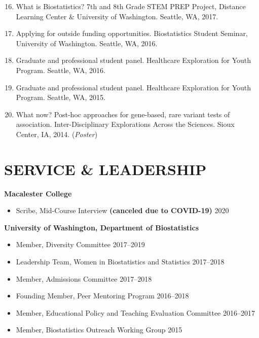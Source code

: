 \documentclass[margin]{res}
\newenvironment{benumerate}[1]{
    \let\oldItem\item
    \def\item{\addtocounter{enumi}{-2}\oldItem}
    
    \begin{enumerate}
    \setcounter{enumi}{#1}
    \addtocounter{enumi}{1}
}{
    \end{enumerate}
}
\begin{document}
\begin{resume}
\begin{benumerate}{15}
\item %
What is Biostatistics? 7th and 8th Grade STEM PREP Project, Distance Learning Center \& University of Washington. Seattle, WA, 2017.

\item %
Applying for outside funding opportunities. Biostatistics Student Seminar, University of Washington. Seattle, WA, 2016.

\item Graduate and professional student panel. Healthcare Exploration for Youth Program. Seattle, WA, 2016.

\item Graduate and professional student panel. Healthcare Exploration for Youth Program. Seattle, WA, 2015.

\item %
What now? Post-hoc approaches for gene-based, rare variant tests of association. Inter-Disciplinary Explorations Across the Sciences. Sioux Center, IA, 2014.  (\textit{Poster})\\
\end{benumerate}

\section{SERVICE \& LEADERSHIP}  
\textbf{Macalester College}
	\begin{itemize} \itemsep -2pt
	\item Scribe, Mid-Course Interview \textbf{(canceled due to COVID-19)}  \hfill 2020
	\end{itemize}

\textbf{University of Washington, Department of Biostatistics}
			\begin{itemize} \itemsep -2pt
			\item Member, Diversity Committee \hfill 2017--2019
			\item Leadership Team, Women in Biostatistics and Statistics \hfill 2017--2018
			\item Member, Admissions Committee \hfill 2017--2018
			\item Founding Member, Peer Mentoring Program \hfill 2016--2018
			\item Member, Educational Policy and Teaching Evaluation Committee \hfill 2016--2017
			\item Member, Biostatistics Outreach Working Group \hfill 2015
			\end{itemize}


\end{resume}
\end{document}
